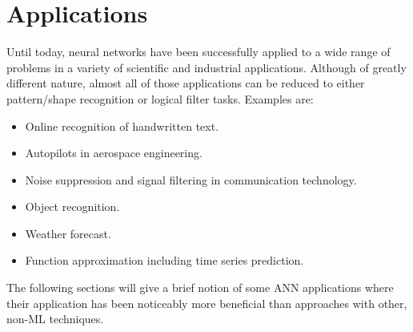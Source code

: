 \documentclass[10pt,a4paper,DIV=11]{scrreprt}
\begin{document}
\section{Applications}
\label{sec:exp}
Until today, neural networks have been successfully applied to a wide range of problems in a variety of scientific and industrial applications. 
Although of greatly different nature, almost all of those applications can be reduced to either pattern/shape recognition or logical filter tasks. 
Examples are:\\
\begin{itemize}
    \item Online recognition of handwritten text.
    \item Autopilots in aerospace engineering.
    \item Noise suppression and signal filtering in communication technology.
    \item Object recognition.
    \item Weather forecast.
    \item Function approximation including time series prediction.  
\end{itemize} 

The following sections will give a brief notion of some ANN applications where their application has been noticeably more beneficial than approaches 
with other, non-ML techniques.
\end{document}
